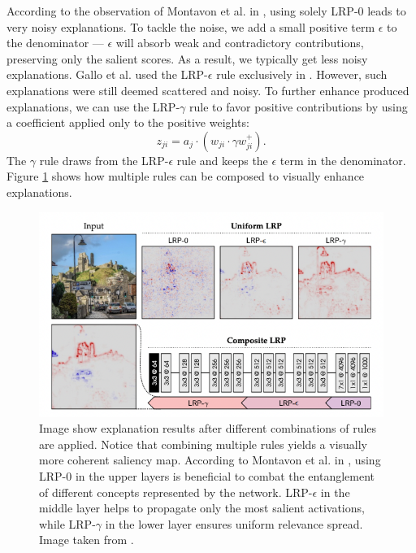 According to the observation of Montavon et al. in \cite{lrp}, using solely LRP-$0$ leads to very noisy explanations.
To tackle the noise, we add a small positive term $\epsilon$ to the denominator --- $\epsilon$ will absorb weak and contradictory contributions, preserving only the salient scores. 
As a result, we typically get less noisy explanations.
Gallo et al. used the LRP-$\epsilon$ rule exclusively in \cite{gallo}.
However, such explanations were still deemed scattered and noisy.
To further enhance produced explanations, we can use the LRP-$\gamma$ rule to favor positive contributions by using a coefficient applied only to the positive weights:
\begin{equation}
    z_{ji} = {a_j \cdot (w_{ji} \cdot \gamma w_{ji}^+)}.
\end{equation}
The $\gamma$ rule draws from the LRP-$\epsilon$ rule and keeps the $\epsilon$ term in the denominator.
Figure \ref{fig:lrp-montavon} shows how multiple rules can be composed to visually enhance explanations.

\begin{figure}[!h]
    \begin{center}
    \begin{minipage}{1\textwidth}
      \includegraphics[width=\textwidth]{img/lrp-montavon.png}
    \end{minipage}
    \caption{Image show explanation results after different combinations of rules are applied. Notice that combining multiple rules yields a visually more coherent saliency map. According to Montavon et al. in \cite{lrp}, using LRP-$0$ in the upper layers is beneficial to combat the entanglement of different concepts represented by the network. LRP-$\epsilon$ in the middle layer helps to propagate only the most salient activations, while LRP-$\gamma$ in the lower layer ensures uniform relevance spread. Image taken from \cite{lrp}.}
    \label{fig:lrp-montavon}
    \end{center}
\end{figure}